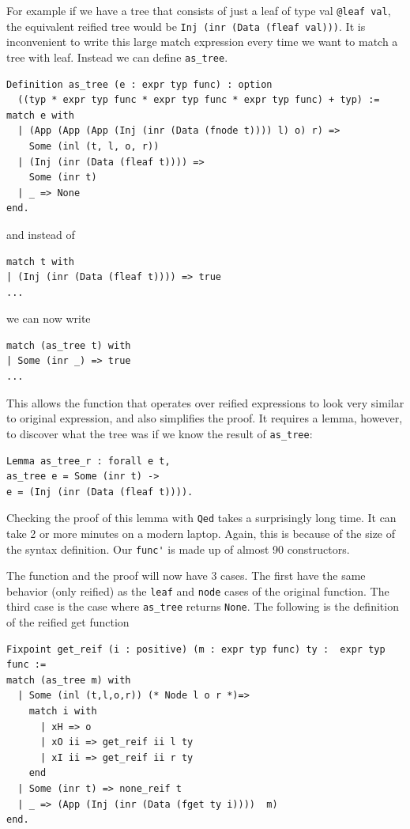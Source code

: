 \documentclass{puthesis}
\begin{document}
For example if we have a tree that consists of just a leaf of type val
\lstinline|@leaf val|, the equivalent reified tree would be
\lstinline|Inj (inr (Data (fleaf val)))|. It is inconvenient to write
this large match expression every time we want to match a tree with
leaf. Instead we can define \lstinline|as_tree|.



\begin{lstlisting}
Definition as_tree (e : expr typ func) : option
  ((typ * expr typ func * expr typ func * expr typ func) + typ) := 
match e with
  | (App (App (App (Inj (inr (Data (fnode t)))) l) o) r) =>
    Some (inl (t, l, o, r))
  | (Inj (inr (Data (fleaf t)))) =>
    Some (inr t)
  | _ => None
end.
\end{lstlisting}

and instead of 

\begin{lstlisting}
match t with
| (Inj (inr (Data (fleaf t)))) => true
...
\end{lstlisting}

we can now write

\begin{lstlisting}
match (as_tree t) with
| Some (inr _) => true
...
\end{lstlisting}

This allows the function that operates over reified expressions to look very
similar to original expression, and also simplifies the proof. It
requires a lemma, however, to discover what the tree was if we know
the result of \lstinline|as_tree|:

\begin{lstlisting}
Lemma as_tree_r : forall e t,
as_tree e = Some (inr t) ->
e = (Inj (inr (Data (fleaf t)))).
\end{lstlisting}

Checking the proof of this lemma with \lstinline|Qed| takes
a surprisingly long time. It can take 2 or more minutes on a modern
laptop. Again, this is because of the size of the syntax definition.
Our \lstinline|func'| is made up of almost 90 constructors.

The function and the proof will now have 3 cases. The first have the
same behavior (only reified) as the \lstinline|leaf| and
\lstinline|node| cases of the original function. The third case is the
case where \lstinline|as_tree| returns \lstinline|None|. The following is the
definition of the reified get function

\begin{lstlisting}
Fixpoint get_reif (i : positive) (m : expr typ func) ty :  expr typ func :=
match (as_tree m) with
  | Some (inl (t,l,o,r)) (* Node l o r *)=>
    match i with 
      | xH => o
      | xO ii => get_reif ii l ty 
      | xI ii => get_reif ii r ty 
    end
  | Some (inr t) => none_reif t
  | _ => (App (Inj (inr (Data (fget ty i))))  m)
end.
\end{lstlisting}
\end{document}
